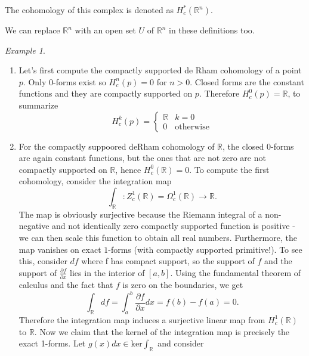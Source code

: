 \documentclass[12pt]{amsart}
\newcommand{\R}{\mathbb{R}} %
\theoremstyle{remark}
\newtheorem{example}{Example}
\begin{document}
The cohomology of this complex is denoted as $H_c^*(\mathbb{R}^n)$. 

We can replace $\R^n$ with an open set $U$ of $\R^n$ in these definitions too. 

\begin{example}
\hfill
    \begin{enumerate}
        \item Let's first compute the compactly supported de Rham cohomology of a point $p$. Only $0$-forms exist so $H_c^n(p)=0$ for $n>0$. Closed forms are the constant functions and they are compactly supported on $p$. Therefore $H_c^0(p)=\mathbb{R}$, to summarize
        \begin{equation*}
            H_c^k(p) = \begin{cases} 
      \mathbb{R} & k=0 \\
    0 & \text{otherwise}
   \end{cases}
        \end{equation*}
        \item For the compactly suppoored deRham cohomology of $\mathbb{R}$, the closed $0$-forms are again constant functions, but the ones that are not zero are not compactly supported on $\mathbb{R}$, hence $H^0_c(\mathbb{R})=0$. To compute the first cohomology, consider the integration map
        \begin{equation*}
            \int_\mathbb{R}: Z^1_c(\R)=\Omega^1_c(\R) \xrightarrow{} \R.
        \end{equation*}
        The map is obviously surjective because the Riemann integral of a non-negative and not identically zero compactly supported function is positive - we can then scale this function to obtain all real numbers. Furthermore, the map vanishes on exact $1$-forms (with compactly supported primitive!). To see this, consider $df$ where f has compact support, so the support of $f$ and the support of $\frac{\partial f}{\partial x}$ lies in the interior of $[a,b]$. Using the fundamental theorem of calculus and the fact that $f$ is zero on the boundaries, we get
        \begin{equation*}
            \int_\mathbb{R}df=\int_a^b\frac{\partial f}{\partial x} dx = f(b)-f(a)=0.
        \end{equation*}
        Therefore the integration map induces a surjective linear map from $H^1_c(\R)$ to $\R$. Now we claim that the kernel of the integration map is precisely the exact 1-forms. Let $g(x)dx\in \text{ker}\int_\R$ and consider 
        \begin{equation*}

\end{equation*}
\end{enumerate}
\end{example}
\end{document}
